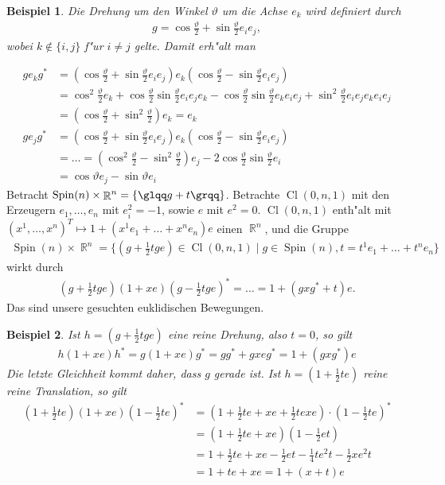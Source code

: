 \documentclass[paper=A4, twoside, chapterprefix=true, bibliography=totoc, headsepline]{scrbook}
\let\temp\phi
\let\phi\varphi
\let\varphi\temp
\let\temp\theta
\let\theta\vartheta
\let\vartheta\temp
\let\temp\epsilon
\let\epsilon\varepsilon
\let\varepsilon\temp
\let\temp\rho
\let\rho\varrho
\let\varrho\temp
\DeclareMathOperator{\R}{\mathbb{R}}
\DeclareMathOperator{\Cl}{Cl}
\DeclareMathOperator{\Spin}{Spin}
\newcommand{\X}{\times}
\theoremstyle{nonumberbreak}
\newtheorem{bsp}{Beispiel}
\theoremstyle{emptybreak}
\theoremstyle{break}
\newcommand{\quot}[1]{\text{\glqq}{#1}\text{\grqq}}
\begin{document}
\begin{bsp}
Die Drehung um den Winkel $\theta$ um die Achse $e_k$ wird definiert durch 
\begin{align*}
	g = \cos \frac{\theta}{2} + \sin \frac{\theta}{2} e_i e_j,
\end{align*}
wobei $k \notin \{i, j\}$ f"ur $i \ne j$ gelte.
Damit erh"alt man
\end{bsp}
\begin{align*}
	g e_k g^* &= \left( \cos \frac{\theta}{2} + \sin \frac{\theta}{2} e_i e_j \right) e_k \left( \cos \frac{\theta}{2} - \sin \frac{\theta}{2} e_i e_j \right) \\
	&= \cos^2 \frac{\theta}{2} e_k + \cos \frac{\theta}{2} \sin \frac{\theta}{2} e_i e_j e_k - \cos \frac{\theta}{2} \sin \frac{\theta}{2} e_k e_i e_j + \sin^2 \frac{\theta}{2} e_i e_j e_k e_i e_j \\
	&= \left( \cos \frac{\theta}{2} + \sin^2 \frac{\theta}{2} \right) e_k = e_k \\
	g e_j g^* &= \left( \cos \frac{\theta}{2} + \sin \frac{\theta}{2} e_i e_j \right) e_k \left( \cos \frac{\theta}{2} - \sin \frac{\theta}{2} e_i e_j \right) \\
	&= \ldots = \left( \cos^2 \frac{\theta}{2} - \sin^2 \frac{\theta}{2} \right) e_j - 2 \cos \frac{\theta}{2} \sin \frac{\theta}{2} e_i \\
	&= \cos \theta e_j - \sin \theta e_i
\end{align*}
Betracht $\Spin(n) \X \R^n = \{ \quot{g + t} \}$.
Betrachte $\Cl(0, n, 1)$ mit den Erzeugern $e_1, \ldots, e_n$ mit $e_i^2 = -1$, sowie $e$ mit $e^2 = 0$.
$\Cl(0, n, 1)$ enth"alt mit $(x^1, \ldots, x^n)^T \mapsto 1 + (x^1 e_1 + \ldots + x^n e_n) e$ einen $\R^n$, und die Gruppe
\begin{align*}
	\Spin(n) \X \R^n = \{ (g + \frac{1}{2} t g e) \in \Cl(0, n, 1) \mid g \in \Spin(n), t = t^1 e_1 + \ldots + t^n e_n \}
\end{align*}
wirkt durch
\begin{align*}
	(g + \frac{1}{2} t g e) (1 + x e) (g - \frac{1}{2} t g e)^* = \ldots = 1 + (g x g^* + t) e.
\end{align*}
Das sind unsere gesuchten euklidischen Bewegungen.

\begin{bsp}
Ist $h = (g + \frac{1}{2} t g e)$ eine reine Drehung, also $t = 0$, so gilt
\begin{align*}
	h(1 + x e) h^* = g(1 + x e) g^* = g g^* + g x e g^* = 1 + (g x g^*) e
\end{align*}
Die letzte Gleichheit kommt daher, dass $g$ gerade ist.
Ist $h = (1 + \frac{1}{2} t e)$ reine reine Translation, so gilt
\begin{align*}
	(1 + \frac{1}{2} t e) (1 + x e) (1 - \frac{1}{2} t e)^*
	&= (1 + \frac{1}{2} t e + x e + \frac{1}{2} t e x e) \cdot (1 - \frac{1}{2} t e )^* \\
	&= (1 + \frac{1}{2} t e + x e) (1 - \frac{1}{2} e t) \\
	&= 1 + \frac{1}{2} t e + x e - \frac{1}{2} e t - \frac{1}{4} t e^2 t - \frac{1}{2} x e^2 t \\
	&= 1 + t e + x e = 1 + (x + t) e
\end{align*}
\end{bsp}
\end{document}
